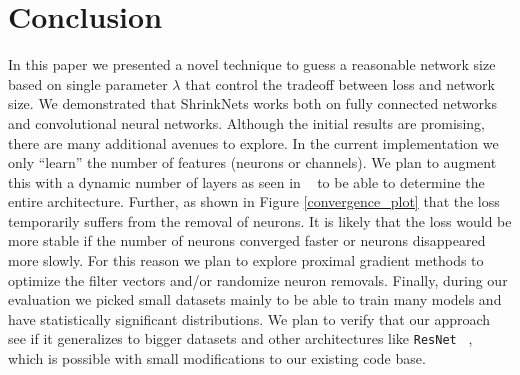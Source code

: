 \documentclass[sigconf]{acmart}
\begin{document}
\section{Conclusion}
In this paper we presented a novel technique to guess a
reasonable network size based on single parameter $\lambda$ that control the
tradeoff between loss and network size. We demonstrated that ShrinkNets works
both on fully connected networks and convolutional neural networks.  Although
the initial results are promising, there are many additional avenues to explore.
In the current implementation we only ``learn'' the number of features (neurons
or channels).  We plan to augment this with a dynamic number of layers as seen
in ~\cite{meier} to be able to determine the entire architecture. Further, as
shown in Figure \ref{convergence_plot} that the loss temporarily suffers from
the removal of neurons. It is likely that the loss would be more stable if the
number of neurons converged faster or neurons disappeared more slowly. For this
reason we plan to explore proximal gradient methods to optimize the filter
vectors and/or randomize neuron removals. Finally, during our evaluation we
picked small datasets mainly to be able to train many models and have
statistically significant distributions. We plan to verify that our approach see
if it generalizes to bigger datasets and other architectures like
\texttt{ResNet} ~\cite{He2016}, which is possible with small modifications to
our existing code base.



\end{document}

